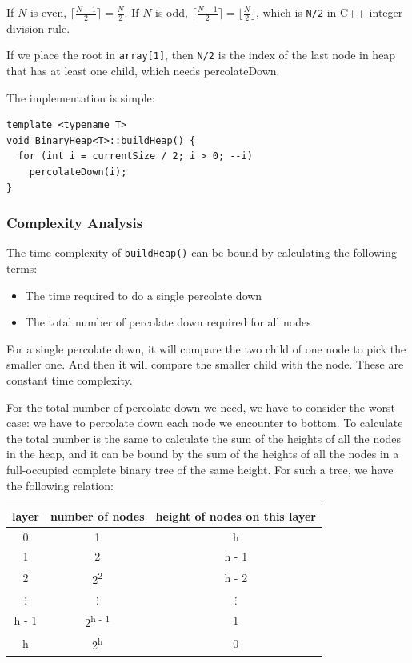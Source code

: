 \documentclass[12pt]{book}
\begin{document}
If \(N\) is even, \(\lceil \frac {N - 1} {2} \rceil = \frac {N} {2}\). If \(N\) is odd, \(\lceil \frac {N - 1} {2} \rceil = \lfloor \frac {N} {2} \rfloor\), which is \texttt{N/2} in C++ integer division rule.

If we place the root in \texttt{array[1]}, then \texttt{N/2} is the index of the last node in heap that has at least one child, which needs percolateDown.

The implementation is simple:
\begin{verbatim}
template <typename T>
void BinaryHeap<T>::buildHeap() {
  for (int i = currentSize / 2; i > 0; --i)
    percolateDown(i);
}
\end{verbatim}
\subsubsection{Complexity Analysis}
\label{sec:org16f2008}

The time complexity of \texttt{buildHeap()} can be bound by calculating the following terms:
\begin{itemize}
\item The time required to do a single percolate down
\item The total number of percolate down required for all nodes
\end{itemize}

For a single percolate down, it will compare the two child of one node to pick the smaller one. And then it will compare the smaller child with the node. These are constant time complexity.

For the total number of percolate down we need, we have to consider the worst case: we have to percolate down each node we encounter to bottom. To calculate the total number is the same to calculate the sum of the heights of all the nodes in the heap, and it can be bound by the sum of the heights of all the nodes in a full-occupied complete binary tree of the same height. For such a tree, we have the following relation:
\begin{center}
\begin{tabular}{ccc}
\hline
layer & number of nodes & height of nodes on this layer\\
\hline
0 & 1 & h\\
1 & 2 & h - 1\\
2 & 2\textsuperscript{2} & h - 2\\
\(\vdots\) & \(\vdots\) & \(\vdots\)\\
h - 1 & 2\textsuperscript{h - 1} & 1\\
h & 2\textsuperscript{h} & 0\\
\hline
\end{tabular}
\end{center}
\end{document}

